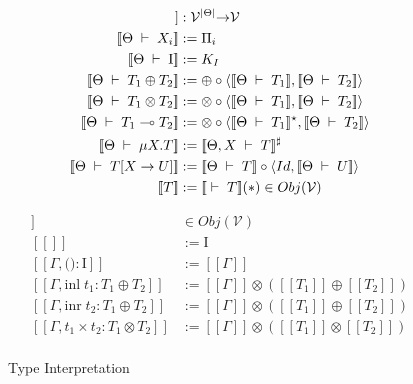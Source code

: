 \documentclass[a4j, dvipdfmx]{jsarticle}
\theoremstyle{definition}
\newcommand{\semantics}[1]{[\![ #1 ]\!]}
\newcommand{\judge}[2]{[\![ #1 \;\vdash\; #2 ]\!]}
\begin{document}
\begin{figure}[H]
  \begin{minipage}[b]{0.48\columnwidth}
    \begin{align*}
      \judge{\Theta}{T}                  &: \mathcal{V}^{|\Theta|} {\bf\rightarrow} \mathcal{V} \\
      \judge{\Theta}{X_i}                &:= \Pi_i \\
      \judge{\Theta}{\mathrm{I}}         &:= K_I \\
      \judge{\Theta}{T_1\oplus{}T_2}     &:= \oplus\circ\langle\judge{\Theta}{T_1},\judge{\Theta}{T_2}\rangle \\
      \judge{\Theta}{T_1\otimes{}T_2}    &:= \otimes\circ\langle\judge{\Theta}{T_1},\judge{\Theta}{T_2}\rangle \\
      \judge{\Theta}{T_1\multimap{}T_2}  &:= \otimes\circ\langle\judge{\Theta}{T_1}^\star,\judge{\Theta}{T_2}\rangle \\
      \judge{\Theta}{\mu{X}.T}           &:= \judge{\Theta,X}{T}^\sharp \\
      \judge{\Theta}{T[X \rightarrow U]} &:= \judge{\Theta}{T}\circ\langle{Id,\judge{\Theta}{U}}\rangle \\
      \semantics{T}                      &:= \judge{}{T}(\ast) \in Obj(\mathcal{V})
    \end{align*}
    \caption{Type Interpretation}
    \label{fig:ty_interpret}
  \end{minipage}
  \begin{minipage}[b]{0.48\columnwidth}
    \begin{align*}
      \semantics{\Gamma}                                     &\in Obj(\mathcal{V}) \\
      \semantics{}                                           &:= \mathrm{I} \\
      \semantics{\Gamma,\text{()}:\mathrm{I}}                &:= \semantics{\Gamma} \\
      \semantics{\Gamma,\text{inl}\;t_1:T_1\oplus{}T_2}      &:= \semantics{\Gamma}\otimes(\semantics{T_1}\oplus\semantics{T_2}) \\
      \semantics{\Gamma,\text{inr}\;t_2:T_1\oplus{}T_2}      &:= \semantics{\Gamma}\otimes(\semantics{T_1}\oplus\semantics{T_2}) \\
      \semantics{\Gamma,t_1\times{}t_2:T_1\otimes{}T_2}      &:= \semantics{\Gamma}\otimes(\semantics{T_1}\otimes\semantics{T_2}) \\

\end{align*}
\end{minipage}
\end{figure}
\end{document}
